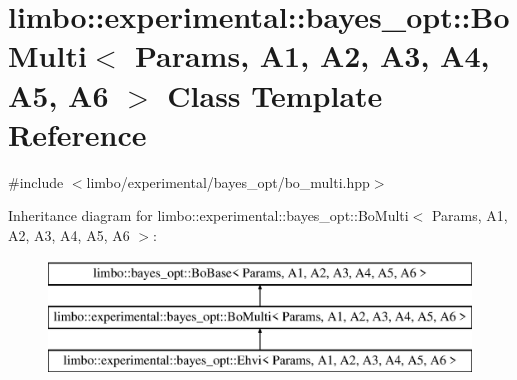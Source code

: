\hypertarget{classlimbo_1_1experimental_1_1bayes__opt_1_1_bo_multi}{}\section{limbo\+:\+:experimental\+:\+:bayes\+\_\+opt\+:\+:Bo\+Multi$<$ Params, A1, A2, A3, A4, A5, A6 $>$ Class Template Reference}
\label{classlimbo_1_1experimental_1_1bayes__opt_1_1_bo_multi}


{\ttfamily \#include $<$limbo/experimental/bayes\+\_\+opt/bo\+\_\+multi.\+hpp$>$}

Inheritance diagram for limbo\+:\+:experimental\+:\+:bayes\+\_\+opt\+:\+:Bo\+Multi$<$ Params, A1, A2, A3, A4, A5, A6 $>$\+:\begin{figure}[H]
\begin{center}
\leavevmode
\includegraphics[height=3.000000cm]{classlimbo_1_1experimental_1_1bayes__opt_1_1_bo_multi}
\end{center}
\end{figure}
